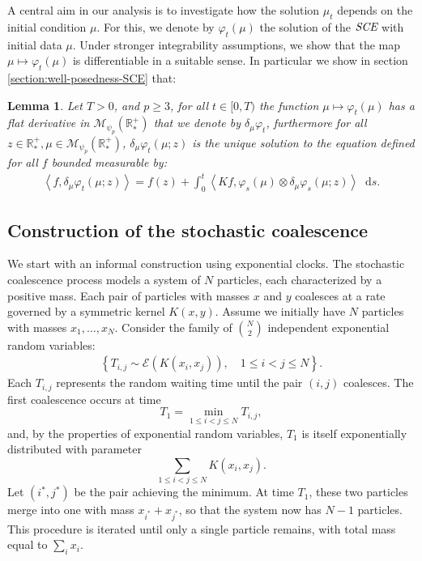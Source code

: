 \documentclass[11pt,a4paper]{article}
\newcommand{\RRP}{\mathbb{R}^+_*}
\newcommand{\MC}{\mathcal{M}}
\newcommand{\SCE}{\emph{SCE}}
\newcommand{\brac}[1]{\left\langle#1\right\rangle}
\newcommand{\dd}{\mathop{}\!\mathrm{d}}
\newtheorem{lemma}[theorem]{Lemma}
\begin{document}
    \medskip
    A central aim in our analysis is to investigate how the solution $\mu_t$ depends on the initial condition $\mu$. For this, we denote by $\varphi_t(\mu)$ the solution of the $\SCE$ with initial data $\mu$. Under stronger integrability assumptions, we show that the map $\mu \mapsto \varphi_t(\mu)$ is differentiable in a suitable sense. In particular we show in section \ref{section:well-posedness-SCE} that:
\begin{lemma}\label{lem:derivative-existence-and-eq}
    Let $T > 0$, and $p \geq 3$, for all $t \in [0,T)$ the function $ \mu \mapsto \varphi_t(\mu)$ has a flat derivative in $\MC_{\psi_p}(\RRP)$ that we denote by $\delta_\mu\varphi_t$, furthermore for all $z \in \RRP, \mu \in \MC_{\psi_p}(\RRP)$, $\delta_\mu\varphi_t(\mu;z)$ is the unique solution to the equation defined for all $f$ bounded measurable by:
    \begin{align*}
        \brac{f,\delta_\mu\varphi_t(\mu;z)} = f(z) + \int_0^t \brac{Kf,\varphi_s(\mu)\otimes \delta_\mu\varphi_s(\mu;z)} \dd s.
    \end{align*}
\end{lemma}
\subsection{Construction of the stochastic coalescence}
We start with an informal construction using exponential clocks. The stochastic coalescence process models a system of $N$ particles, each characterized by a positive mass. Each pair of particles with masses $x$ and $y$ coalesces at a rate governed by a symmetric kernel $K(x,y)$. Assume we initially have $N$ particles with masses $x_{1}, \ldots, x_{N}$. Consider the family of $\binom{N}{2}$ independent exponential random variables:
\begin{align*}
    \left\lbrace T_{i,j} \sim \mathcal{E}\left(K(x_{i},x_{j})\right), \quad 1 \leq i < j \leq N \right\rbrace.
\end{align*}
Each $T_{i,j}$ represents the random waiting time until the pair $(i,j)$ coalesces. The first coalescence occurs at time
\[
    T_1 = \min_{1 \leq i < j \leq N} T_{i,j},
\]
and, by the properties of exponential random variables, $T_1$ is itself exponentially distributed with parameter
\[
    \sum_{1 \leq i < j \leq N} K(x_{i},x_{j}).
\]
Let $(i^*, j^*)$ be the pair achieving the minimum. At time $T_1$, these two particles merge into one with mass $x_{i^*} + x_{j^*}$, so that the system now has $N-1$ particles. This procedure is iterated until only a single particle remains, with total mass equal to $\sum_i x_i$.
\end{document}
